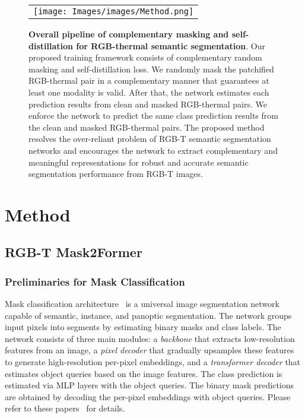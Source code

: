 \documentclass[10pt,twocolumn,letterpaper]{article}
\begin{document}
%
 \begin{figure*}[t]
\begin{center} 
\begin{tabular}{@{}c} 
    \texttt{[image: Images/images/Method.png]}
    \end{tabular}
\end{center}
\vspace{-0.15in}
\caption{{\bf Overall pipeline of complementary masking and self-distillation for RGB-thermal semantic segmentation}. 
Our proposed training framework consists of complementary random masking and self-distillation loss.
We randomly mask the patchified RGB-thermal pair in a complementary manner that guarantees at least one modality is valid.  
After that, the network estimates each prediction results from clean and masked RGB-thermal pairs.
We enforce the network to predict the same class prediction results from the clean and masked RGB-thermal pairs.
The proposed method resolves the over-reliant problem of RGB-T semantic segmentation networks and encourages the network to extract complementary and meaningful representations for robust and accurate semantic segmentation performance from RGB-T images.}
\label{fig:overall_pipeline}
\end{figure*}


 
\section{Method} 
\label{sec:method}
\subsection{RGB-T Mask2Former}
\subsubsection{Preliminaries for Mask Classification}
Mask classification architecture~\cite{cheng2021maskformer,cheng2022masked} is a universal image segmentation network capable of semantic, instance, and panoptic segmentation. 
The network groups input pixels into  segments by estimating  binary masks and  class labels.
The network consists of three main modules: a \textit{backbone} that extracts low-resolution features from an image, a \textit{pixel decoder} that gradually upsamples these features to generate high-resolution per-pixel embeddings, and a \textit{transformer decoder} that estimates object queries based on the image features. 
The class prediction is estimated via MLP layers with the object queries.
The binary mask predictions are obtained by decoding the per-pixel embeddings with object queries.
Please refer to these papers~\cite{cheng2021maskformer,cheng2022masked} for details. 
\end{document}
